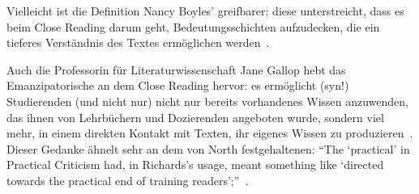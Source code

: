 Vielleicht ist die Definition Nancy Boyles' greifbarer: diese unterstreicht, dass es beim Close Reading darum geht, Bedeutungsschichten aufzudecken, die ein tieferes Verständnis des Textes ermöglichen werden~\autocite[90]{Boyles2016}.

Auch die Professorin für Literaturwissenschaft Jane Gallop hebt das Emanzipatorische an dem Close Reading hervor: es ermöglicht (syn!) Studierenden (und nicht nur) nicht nur bereits vorhandenes Wissen anzuwenden, das ihnen von Lehrbüchern und Dozierenden angeboten wurde, sondern viel mehr, in einem direkten Kontakt mit Texten, ihr eigenes Wissen zu produzieren~\autocite{Gallop2007}.
Dieser Gedanke ähnelt sehr an dem von North festgehaltenen: ``The `practical' in Practical Criticism had, in Richards’s usage, meant something like `directed towards the practical end of training readers';''~\autocite{North2013}.


